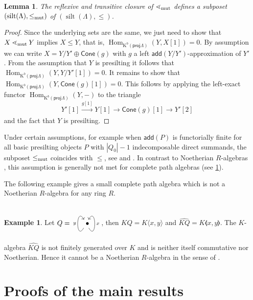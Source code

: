 \documentclass[11pt]{amsart}
\newcommand{\add}{\mathsf{add}}
\newcommand{\proj}{\mathsf{proj}}
\newcommand{\cone}{\mathsf{Cone}}
\DeclareMathOperator{\Hom}{\mathrm{Hom}}
\DeclareMathOperator{\silt}{\mathrm{silt}}
\newtheorem{lemma}[theorem]{Lemma}
\theoremstyle{definition}
\newtheorem{example}[theorem]{Example}
\begin{document}
\begin{lemma}\label{lem:submutationposet}
	The reflexive and transitive closure of $\lessdot_{\textnormal{mut}}$ defines a subposet $(\silt (\Lambda), \leq_{\textnormal{mut}})$ of $(\silt (\Lambda), \leq)$. 
\end{lemma} 
\begin{proof}
	Since the underlying sets are the same, we just need to show that $X \lessdot_{\textnormal{mut}} Y$ implies $X \leq Y$, that is, $\Hom_{\mathrm{K}^b(\proj \Lambda)}(Y, X[1]) = 0$. By assumption we can write $X = Y/Y' \oplus \cone(g)$ with $g$ a left $\add (Y/Y')$-approximation of $Y'$. From the assumption that $Y$ is presilting it follows that $\Hom_{\mathrm{K}^b(\proj \Lambda)}(Y, Y/Y'[1]) = 0$. It remains to show that $\Hom_{\mathrm{K}^b(\proj \Lambda)}(Y, \cone(g)[1]) = 0$. This follows by applying the left-exact functor $\Hom_{\mathrm{K}^b(\proj \Lambda)}(Y,-)$ to the triangle 
	\[ Y'[1] \xrightarrow[]{{g[1]}} Y[1] \to \cone(g)[1] \to Y'[2]\]
	 and the fact that $Y$ is presilting. 
\end{proof}

Under certain assumptions, for example when $\add(P)$ is functorially finite for all basic presilting objects $P$ with $|Q_0|-1$ indecomposable direct summands, the subposet $\leq_{\textnormal{mut}}$ coincides with $\leq$, see \cite[Sec. 2.6]{Aihara_2012} and \cite[Sec. 2.4]{Kimura2024}. In contrast to Noetherian $R$-algebras \cite[Lem. 2.3]{Kimura2024}, this assumption is generally not met for complete path algebras (see \cref{eq:sec3}). 

The following example gives a small complete path algebra which is not a Noetherian $R$-algebra for any ring $R$. 

\begin{example}\label{exmp:notNoetherian}
	Let $Q= \begin{tikzcd} \bullet \arrow[loop, in=60, out=-60, looseness=5, "x",swap] \arrow[loop, in=120, out=240, looseness=5, "y"]\end{tikzcd}$, then $KQ = K\langle x,y \rangle$ and $\widehat{KQ} = K \llangle x,y \rrangle$. The $K$-algebra $\widehat{KQ}$ is not finitely generated over $K$ and is neither itself commutative nor Noetherian. Hence it cannot be a Noetherian $R$-algebra in the sense of \cite{Ausl1977}.
\end{example}



\section{Proofs of the main results}\label{eq:sec3}
\end{document}
